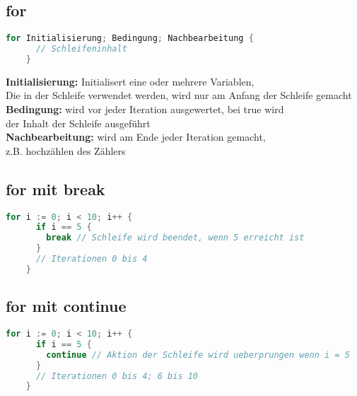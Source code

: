 \documentclass[twoside,a4paper,12pt]{article}
\begin{document}
\subsection{for}
\begin{center}
  \begin{minipage}{1.0\textwidth}
    \begin{lstlisting}[language=Go]
    for Initialisierung; Bedingung; Nachbearbeitung {
      // Schleifeninhalt
    }
    \end{lstlisting}
  \end{minipage}
\end{center}
\textbf{Initialisierung:} Initialisert eine oder mehrere Variablen, \\ 
Die in der Schleife verwendet werden, wird nur am Anfang der Schleife gemacht \\ 
\textbf{Bedingung:} wird vor jeder Iteration ausgewertet, bei true wird \\ 
der Inhalt der Schleife ausgeführt \\ 
\textbf{Nachbearbeitung:} wird am Ende jeder Iteration gemacht, \\ 
z.B. hochzählen des Zählers \\ 

\subsection{for mit break}
\begin{center}
  \begin{minipage}{1.0\textwidth}
    \begin{lstlisting}[language=Go]
    for i := 0; i < 10; i++ {
      if i == 5 {
        break // Schleife wird beendet, wenn 5 erreicht ist
      }
      // Iterationen 0 bis 4
    }
    \end{lstlisting}
  \end{minipage}
\end{center}

\subsection{for mit continue}
\begin{center}
  \begin{minipage}{1.0\textwidth}
    \begin{lstlisting}[language=Go]
    for i := 0; i < 10; i++ {
      if i == 5 {
        continue // Aktion der Schleife wird ueberprungen wenn i = 5 
      }
      // Iterationen 0 bis 4; 6 bis 10
    }
    \end{lstlisting}
  \end{minipage}
\end{center}
\end{document}
